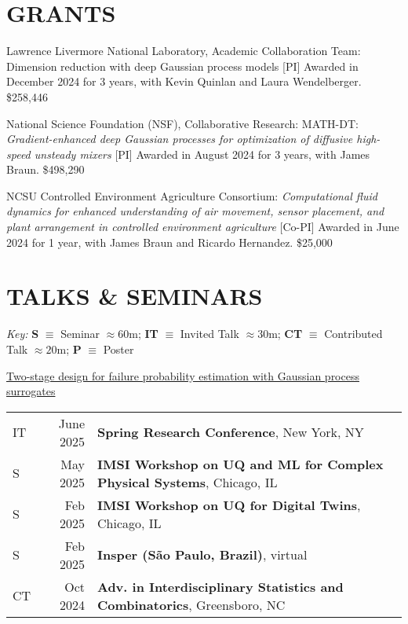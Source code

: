 \documentclass[margin,line,11pt]{res}
\begin{document}
\begin{resume}
\section{\bf GRANTS}

Lawrence Livermore National Laboratory, Academic Collaboration Team: Dimension reduction with 
deep Gaussian process models [PI] Awarded in December 2024 for 3 years, with Kevin Quinlan
and Laura Wendelberger. \hfill \$258,446

National Science Foundation (NSF), Collaborative Research: MATH-DT: {\it Gradient-enhanced
deep Gaussian processes for optimization of diffusive high-speed unsteady mixers} [PI]
Awarded in August 2024 for 3 years, with James Braun.  \hfill \$498,290

NCSU Controlled Environment Agriculture Consortium: {\it Computational fluid dynamics for
enhanced understanding of air movement, sensor placement, and plant arrangement in controlled
environment agriculture} [Co-PI] Awarded in June 2024 for 1 year, with James Braun and 
Ricardo Hernandez. \hfill \$25,000

\medskip
\section{\bf TALKS \& SEMINARS}
{\em Key:}
{\bf S} $\equiv$ Seminar $\approx60$m;
{\bf IT} $\equiv$ Invited Talk $\approx30$m;
{\bf CT} $\equiv$ Contributed Talk $\approx20$m; 
{\bf P} $\equiv$ Poster %

\underline{Two-stage design for failure probability estimation with Gaussian process surrogates}\\
\begin{tabular}{lrl}
IT\quad\quad & June 2025 & {\bf Spring Research Conference}, New York, NY \\
S\quad\quad & May 2025 & {\bf IMSI Workshop on UQ and ML for Complex Physical Systems}, Chicago, IL \\
S\quad\quad & Feb 2025 & {\bf IMSI Workshop on UQ for Digital Twins}, Chicago, IL \\
S\quad\quad & Feb 2025 & {\bf Insper (S\~ao Paulo, Brazil)}, virtual \\
CT\quad\quad & Oct 2024 & {\bf Adv. in Interdisciplinary Statistics and Combinatorics}, Greensboro, NC \\
\end{tabular}


\end{resume}
\end{document}
